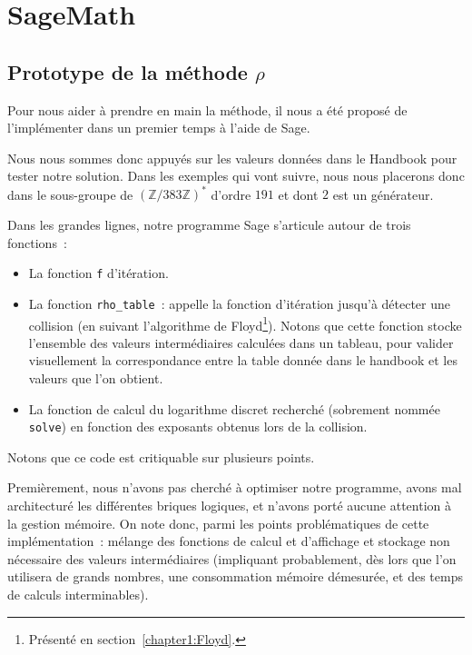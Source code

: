     \section{SageMath}
        \subsection{Prototype de la méthode \texorpdfstring{$\rho$}{Rho}}
        Pour nous aider à prendre en main la méthode, il nous a été proposé de l'implémenter dans un premier temps à l'aide de Sage.

        Nous nous sommes donc appuyés sur les valeurs données dans le Handbook pour tester notre solution.
        Dans les exemples qui vont suivre, nous nous placerons donc dans le sous-groupe de ${(\mathbb{Z}/383\mathbb{Z})}^*$ d'ordre $191$ et dont $2$ est un générateur.

        Dans les grandes lignes, notre programme Sage s'articule autour de trois fonctions~:
        \begin{itemize}
            \item La fonction \lstinline{f} d'itération.
            \item La fonction \lstinline{rho_table}~: appelle la fonction d'itération jusqu'à détecter une collision (en suivant l'algorithme de Floyd\footnote{Présenté en section~\ref{chapter1:Floyd}.}). Notons que cette fonction stocke l'ensemble des valeurs intermédiaires calculées dans un tableau, pour valider visuellement la correspondance entre la table donnée dans le handbook\autocite[107]{handbook} et les valeurs que l'on obtient.
            \item La fonction de calcul du logarithme discret recherché (sobrement nommée \lstinline{solve}) en fonction des exposants obtenus lors de la collision.
        \end{itemize}

        Notons que ce code est critiquable sur plusieurs points.

        Premièrement, nous n'avons pas cherché à optimiser notre programme, avons mal architecturé les différentes briques logiques, et n'avons porté aucune attention à la gestion mémoire.
        On note donc, parmi les points problématiques de cette implémentation~: mélange des fonctions de calcul et d'affichage et stockage non nécessaire des valeurs intermédiaires (impliquant probablement, dès lors que l'on utilisera de grands nombres, une consommation mémoire démesurée, et des temps de calculs interminables).

